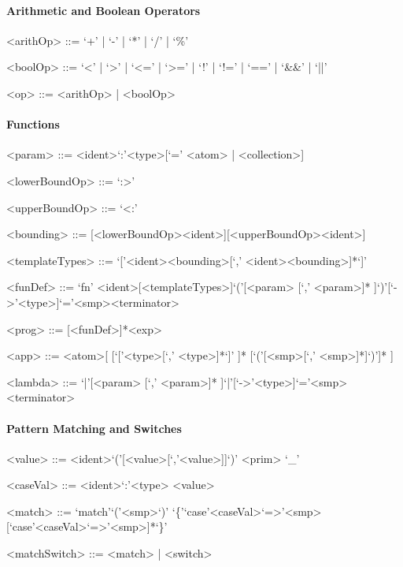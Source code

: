 \documentclass[11pt]{article} %
\begin{document}
\paragraph{Arithmetic and Boolean Operators}

\begin{grammar}

<arithOp> ::= `+' | `-' | `*' | `/' | `\%'

<boolOp> ::= `<' | `>' | `<=' | `>=' | `!' | `!=' | `==' | `\&\&' | `||'

<op> ::= <arithOp> | <boolOp> 

\end{grammar}

\paragraph{Functions}

\begin{grammar}

<param> ::= <ident>`:'<type>[`=' <atom> | <collection>]

<lowerBoundOp> ::= `:>'

<upperBoundOp> ::= `<:'

<bounding> ::= [<lowerBoundOp><ident>][<upperBoundOp><ident>]

<templateTypes> ::= `['<ident><bounding>[`,' <ident><bounding>]*`]'

<funDef> ::= `fn' <ident>[<templateTypes>]`('[<param> [`,' <param>]* ]`)'[`->'<type>]`='<smp><terminator>

<prog> ::= [<funDef>]*<exp>

<app> ::= <atom>[ [`['<type>[`,' <type>]*`]' ]* [`('[<smp>[`,' <smp>]*]`)']* ]

<lambda> ::= `|'[<param> [`,' <param>]* ]`|'[`->'<type>]`='<smp><terminator>

\end{grammar}

\paragraph{Pattern Matching and Switches}

\begin{grammar}

<value> ::= <ident>`('[<value>[`,'<value>]]`)'
\alt <prim>
\alt `\_'

<caseVal> ::= <ident>`:'<type>
\alt <value>

<match> ::= `match'`('<smp>`)' `\{'`case'<caseVal>`=>'<smp>[`case'<caseVal>`=>'<smp>]*`\}'

<matchSwitch> ::= <match> | <switch>

\end{grammar}
\end{document}
